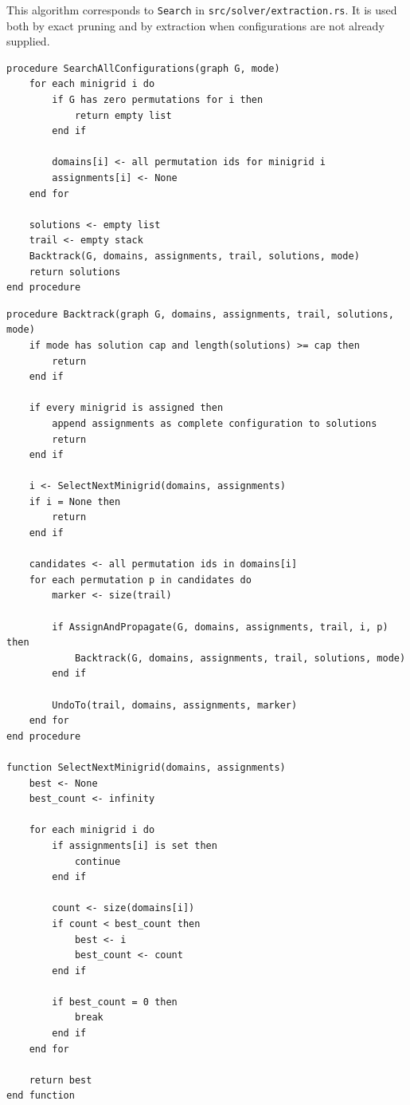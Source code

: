 \documentclass[11pt,a4paper]{article}
\begin{document}
This algorithm corresponds to \texttt{Search} in \texttt{src/solver/extraction.rs}. It is used both by exact pruning and by extraction when configurations are not already supplied.

\begin{lstlisting}[caption={Search all compatible minigrid configurations}]
procedure SearchAllConfigurations(graph G, mode)
    for each minigrid i do
        if G has zero permutations for i then
            return empty list
        end if

        domains[i] <- all permutation ids for minigrid i
        assignments[i] <- None
    end for

    solutions <- empty list
    trail <- empty stack
    Backtrack(G, domains, assignments, trail, solutions, mode)
    return solutions
end procedure
\end{lstlisting}

\begin{lstlisting}[caption={Backtracking with MRV and propagation}]
procedure Backtrack(graph G, domains, assignments, trail, solutions, mode)
    if mode has solution cap and length(solutions) >= cap then
        return
    end if

    if every minigrid is assigned then
        append assignments as complete configuration to solutions
        return
    end if

    i <- SelectNextMinigrid(domains, assignments)
    if i = None then
        return
    end if

    candidates <- all permutation ids in domains[i]
    for each permutation p in candidates do
        marker <- size(trail)

        if AssignAndPropagate(G, domains, assignments, trail, i, p) then
            Backtrack(G, domains, assignments, trail, solutions, mode)
        end if

        UndoTo(trail, domains, assignments, marker)
    end for
end procedure

function SelectNextMinigrid(domains, assignments)
    best <- None
    best_count <- infinity

    for each minigrid i do
        if assignments[i] is set then
            continue
        end if

        count <- size(domains[i])
        if count < best_count then
            best <- i
            best_count <- count
        end if

        if best_count = 0 then
            break
        end if
    end for

    return best
end function
\end{lstlisting}
\end{document}

